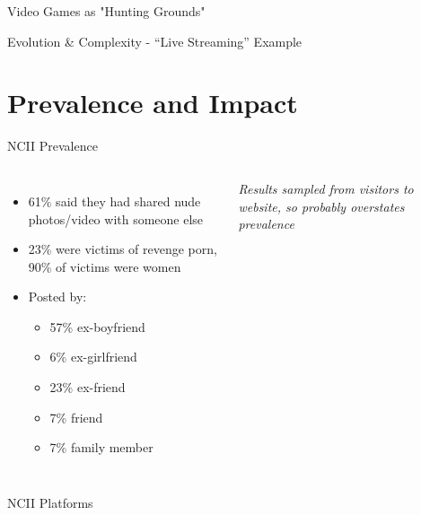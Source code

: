 \documentclass[nobackground,dvipsnames,table,aspectratio=169]{beamer}
\begin{document}
\begin{frame}{Video Games as "Hunting Grounds"}
\end{frame}

\begin{frame}{Evolution & Complexity - “Live Streaming” Example}
\end{frame}

\section{Prevalence and Impact}

\begin{frame}{NCII Prevalence}
    \begin{columns}
            \begin{itemize}
                \item 61\% said they had shared nude photos/video with someone else
                \item 23\% were victims of revenge porn, 90\% of victims were women
                \item Posted by:
                \begin{itemize}
                    \item 57\% ex-boyfriend
                    \item 6\% ex-girlfriend
                    \item 23\% ex-friend
                    \item 7\% friend
                    \item 7\% family member
                \end{itemize}
            \end{itemize}
            \textit{Results sampled from visitors to website, so probably overstates prevalence}
    \end{columns}
\end{frame}

\begin{frame}{NCII Platforms}
\end{frame}
\end{document}
